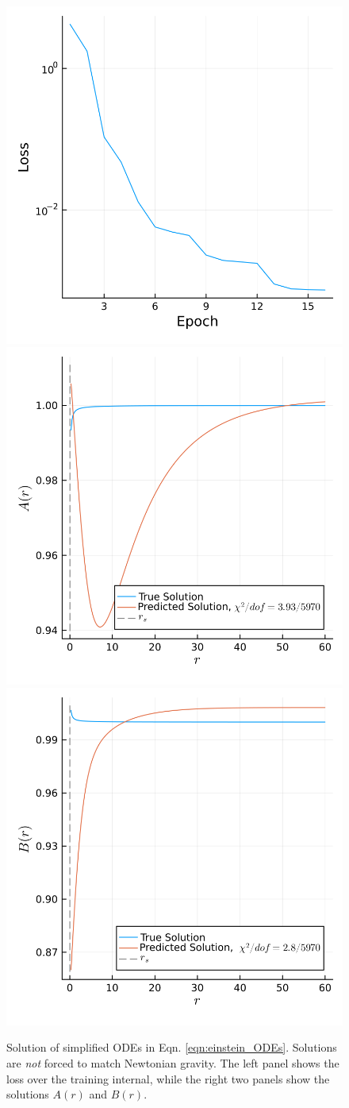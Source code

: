 \documentclass{CUP-JNL-DTM}%
\theoremstyle{definition}
\numberwithin{equation}{section}
\begin{document}
\begin{figure}
    \centering
    \includegraphics[width=0.3\linewidth]{figures/plots_before/loss.png}
    \includegraphics[width=0.3\linewidth]{figures/plots_before/A.png}
    \includegraphics[width=0.3\linewidth]{figures/plots_before/B.png}
    \caption{Solution of simplified ODEs in Eqn. \ref{eqn:einstein_ODEs}. Solutions are \emph{not} forced to match Newtonian gravity. The left panel shows the loss over the training internal, while the right two panels show the solutions $A(r)$ and $B(r)$.}
    \label{fig:before}
\end{figure}
\end{document}
